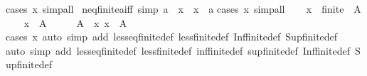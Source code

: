 \begin{isabellebody}
{\isacharparenleft}{\kern0pt}cases\ x{\isacharparenright}{\kern0pt}\ simp{\isacharunderscore}{\kern0pt}all%
\endisatagproof
{\isafoldproof}%
%
\isadelimproof
\isanewline
%
\endisadelimproof
\isanewline
{}\isamarkupfalse%
\ neq{\isacharunderscore}{\kern0pt}finite{\isacharunderscore}{\kern0pt}{}{\isacharunderscore}{\kern0pt}aiff{\isacharprime}{\kern0pt}\ {\isacharbrackleft}{\kern0pt}simp{\isacharbrackright}{\kern0pt}{\isacharcolon}{\kern0pt}\ {\isachardoublequoteopen}a\ {\isasymnoteq}\ x\ {\isasymlongleftrightarrow}\ x\ {\isacharequal}{\kern0pt}\ a\isanewline
%
\isadelimproof
%
\endisadelimproof
%
\isatagproof
{}\isamarkupfalse%
{\isacharparenleft}{\kern0pt}cases\ x{\isacharparenright}{\kern0pt}\ simp{\isacharunderscore}{\kern0pt}all%
\endisatagproof
{\isafoldproof}%
%
\isadelimproof
\isanewline
%
\endisadelimproof
\isanewline
{}\isamarkupfalse%
\isanewline
%
\isadelimproof
%
\endisadelimproof
%
\isatagproof
{}\isamarkupfalse%
\isanewline
\ \ \isamarkupfalse%
\ x\ {\isacharcolon}{\kern0pt}{\isacharcolon}{\kern0pt}\ finite{\isacharunderscore}{\kern0pt}{}\ \ A\isanewline
\ \ \isamarkupfalse%
\ {\isachardoublequoteopen}x\ {\isasymin}\ A{\isachardoublequoteclose}\isanewline
\ \ \isamarkupfalse%
\ \isamarkupfalse%
\ {\isachardoublequoteopen}{\isasymSqinter}A\ {\isasymle}\ x{\isachardoublequoteclose}\ {\isachardoublequoteopen}x\ {\isasymle}\ {\isasymSqunion}A{\isachardoublequoteclose}\isanewline
\ \ \ \ \isamarkupfalse%
{\isacharparenleft}{\kern0pt}cases\ x{\isacharsemicolon}{\kern0pt}\ auto\ simp\ add{\isacharcolon}{\kern0pt}\ less{\isacharunderscore}{\kern0pt}eq{\isacharunderscore}{\kern0pt}finite{\isacharunderscore}{\kern0pt}{}{\isacharunderscore}{\kern0pt}def\ less{\isacharunderscore}{\kern0pt}finite{\isacharunderscore}{\kern0pt}{}{\isacharunderscore}{\kern0pt}def\ Inf{\isacharunderscore}{\kern0pt}finite{\isacharunderscore}{\kern0pt}{}{\isacharunderscore}{\kern0pt}def\ Sup{\isacharunderscore}{\kern0pt}finite{\isacharunderscore}{\kern0pt}{}{\isacharunderscore}{\kern0pt}def{\isacharparenright}{\kern0pt}{\isacharplus}{\kern0pt}\isanewline
{}\isamarkupfalse%
{\isacharparenleft}{\kern0pt}auto\ simp\ add{\isacharcolon}{\kern0pt}\ less{\isacharunderscore}{\kern0pt}eq{\isacharunderscore}{\kern0pt}finite{\isacharunderscore}{\kern0pt}{}{\isacharunderscore}{\kern0pt}def\ less{\isacharunderscore}{\kern0pt}finite{\isacharunderscore}{\kern0pt}{}{\isacharunderscore}{\kern0pt}def\ inf{\isacharunderscore}{\kern0pt}finite{\isacharunderscore}{\kern0pt}{}{\isacharunderscore}{\kern0pt}def\ sup{\isacharunderscore}{\kern0pt}finite{\isacharunderscore}{\kern0pt}{}{\isacharunderscore}{\kern0pt}def\ Inf{\isacharunderscore}{\kern0pt}finite{\isacharunderscore}{\kern0pt}{}{\isacharunderscore}{\kern0pt}def\ Sup{\isacharunderscore}{\kern0pt}finite{\isacharunderscore}{\kern0pt}{}{\isacharunderscore}{\kern0pt}def{\isacharparenright}{\kern0pt}%

\end{isabellebody}
